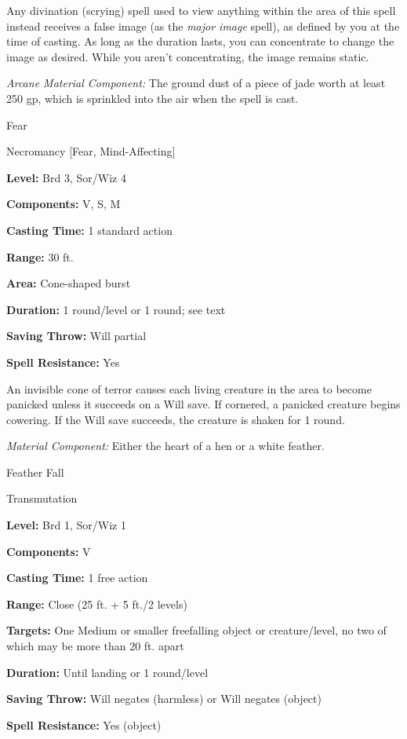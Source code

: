 \documentclass{article}
\begin{document}
Any divination (scrying) spell used to view anything within the area of this spell 
instead receives a false image (as the \textit{major image }spell), as defined 
by you at the time of casting. As long as the duration lasts, you can concentrate 
to change the image as desired. While you aren't concentrating, the image remains 
static.

\textit{Arcane Material Component: }The ground dust of a piece of jade worth at 
least 250 gp, which is sprinkled into the air when the spell is cast.

\vspace{12pt}
Fear

Necromancy [Fear, Mind-Affecting]

\textbf{Level:} Brd 3, Sor/Wiz 4

\textbf{Components:} V, S, M

\textbf{Casting Time:} 1 standard action

\textbf{Range:} 30 ft.

\textbf{Area:} Cone-shaped burst

\textbf{Duration:} 1 round/level or 1 round; see text

\textbf{Saving Throw: }Will partial

\textbf{Spell Resistance:} Yes

An invisible cone of terror causes each living creature in the area to become panicked 
unless it succeeds on a Will save. If cornered, a panicked creature begins cowering. 
If the Will save succeeds, the creature is shaken for 1 round.

\textit{Material Component: }Either the heart of a hen or a white feather.

\vspace{12pt}
Feather Fall

Transmutation

\textbf{Level:} Brd 1, Sor/Wiz 1

\textbf{Components:} V

\textbf{Casting Time:} 1 free action

\textbf{Range:} Close (25 ft. + 5 ft./2 levels)

\textbf{Targets:} One Medium or smaller freefalling object or creature/level, no 
two of which may be more than 20 ft. apart

\textbf{Duration:} Until landing or 1 round/level

\textbf{Saving Throw: }Will negates (harmless) or Will negates (object)

\textbf{Spell Resistance:} Yes (object)
\end{document}
